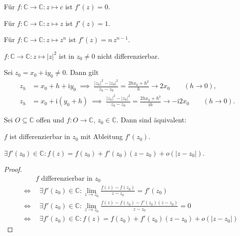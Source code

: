 \begin{example} \label{thm:1.23}
  \begin{enum-arab}
    \item Für $f : \mathbb{C} \to \mathbb{C} : z \mapsto c$ ist $f'(z)=0$.
    
    \item Für $f : \mathbb{C} \to \mathbb{C} : z \mapsto z$ ist $f'(z)=1$.
    
    \item Für $f : \mathbb{C} \to \mathbb{C} : z \mapsto z^n$ ist $f'(z)=n \, z^{n-1}$.
    
    \item $f : \mathbb{C} \to \mathbb{C} : z \mapsto |z|^2$ ist in $z_0 \neq 0$ nicht differenzierbar.
    
    Sei $z_0 = x_0 + \mathrm{i} y_0 \neq 0$.
    Dann gilt
    \begin{align*}
      z_h &= x_0 + h + \mathrm{i} y_0 \; \implies \; \frac{|z_h|^2 - |z_0|^2}{z_h - z_0} = \frac{2 h x_0 + h^2}{h} \to 2 x_0 \qquad (h \to 0),\\
      z_h &= x_0 + \mathrm{i} (y_0 + h) \; \implies \; \frac{|z_h|^2 - |z_0|^2}{z_h - z_0} = \frac{2 h x_0 + h^2}{\mathrm{i} h} \to - \mathrm{i} 2 x_0 \qquad (h \to 0).
    \end{align*}
  \end{enum-arab}
\end{example}


\begin{theorem}[Satz]
  Sei $O \subseteq \mathbb{C}$ offen und $f : O \to \mathbb{C}$, $z_0 \in \mathbb{C}$. Dann sind äquivalent:
  \begin{enum-roman}
    \item $f$ ist differenzierbar in $z_0$ mit Ableitung $f'(z_0)$.
    
    \item $\exists f'(z_0) \in \mathbb{C} : f(z) = f(z_0) + f'(z_0) (z-z_0) + o(|z-z_0|)$.
  \end{enum-roman}
  
  \begin{proof}
    \begin{align*}
      &\qquad \text{$f$ differenzierbar in $z_0$} \\
      &\iff \quad \exists f'(z_0) \in \mathbb{C} : \lim_{z\to z_0} \frac{f(z)-f(z_0)}{z-z_0} = f'(z_0) \\
      &\iff \quad \exists f'(z_0) \in \mathbb{C} : \lim_{z\to z_0} \frac{f(z)-f(z_0)-f'(z_0)(z-z_0)}{z-z_0} = 0 \\
      &\iff \quad \exists f'(z_0) \in \mathbb{C} : f(z) = f(z_0) + f'(z_0)(z-z_0) + o(|z-z_0|)
    \end{align*}
  \end{proof}
\end{theorem}

